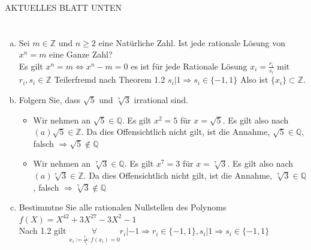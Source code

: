 \documentclass{article}
\newcommand{\Z}{\mathbb{Z}}
\newcommand{\Q}{\mathbb{Q}}
\begin{document}
\maketitle
\color{purple}
AKTUELLES BLATT UNTEN
\color{black}
\section{}
\subsection{}
\begin{enumerate}[(a)]
    \item
        \color{blue}
            Sei $m\in\Z$ und $n\geq 2$ eine Natürliche Zahl.
            Ist jede rationale Lösung von $x^n=m$ eine
            Ganze Zahl?\\
        \color{black}
        Es gilt
        $x^n=m\Leftrightarrow x^n-m=0$
        es ist für jede Rationale Lösung
        $x_i=\frac{r_i}{s_i}$ mit $r_i,s_i\in\Z$ Teilerfremd
        nach Theorem 1.2
        $s_i|1\Rightarrow s_i\in\{-1,1\}$
        Also ist $\{x_i\}\subset\Z$.
    \item
        \color{blue}
            Folgern Sie, dass $\sqrt{5}$ und $\sqrt[7]{3}$
            irrational sind.\\
        \color{black}
        \begin{itemize}
            \item
                Wir nehmen an $\sqrt{5}\in\Q$.
                Es gilt $x^2=5$ für $x=\sqrt{5}$.
                Es gilt also nach $(a) \sqrt{5}\in\Z$.
                Da dies Offensichtlich nicht gilt,
                ist die Annahme, $\sqrt{5}\in\Q$, falsch
                $\Rightarrow\sqrt{5}\notin\Q$
            \item
                Wir nehmen an $\sqrt[7]{3}\in\Q$.
                Es gilt $x^7=3$ für $x=\sqrt[7]{3}$.
                Es gilt also nach $(a) \sqrt[7]{3}\in\Z$.
                Da dies Offensichtlich nicht gilt,
                ist die Annahme, $\sqrt[7]{3}\in\Q$, falsch
                $\Rightarrow\sqrt[7]{3}\notin\Q$
        \end{itemize}
    \item
        \color{blue}
        Bestimmtne Sie alle rationalen Nullstellen des
        Polynoms $f(X)=X^{42}+3X^{27}-3X^2-1$\\
        \color{black}
        Nach 1.2 gilt
        $\underset{x_i:=\frac{r_i}{s_i}:f(x_i)=0}\forall
        r_i|-1\Rightarrow r_i\in\{-1,1\},
        s_i|1\Rightarrow s_i\in\{-1,1\}$


\end{enumerate}
\end{document}
